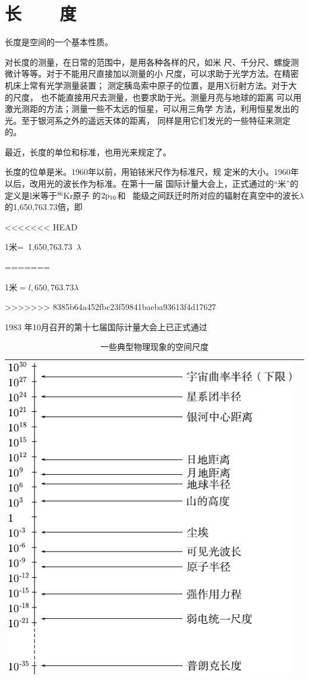 \section[长度]{长~~~~度}\label{sec:01.03}

长度是空间的一个基本性质。

对长度的测量，在日常的范围中，是用各种各样的尺，如米
尺、千分尺、螺旋测微计等等。对于不能用尺直接加以测量的小
尺度，可以求助于光学方法。在精密机床上常有光学测量装置；
测定胰岛索中原子的位置，是用X衍射方法。对于大的尺度，
也不能直接用尺去测量，也要求助于光。测量月亮与地球的距离
可以用激光测距的方法；测量一些不太远的恒星，可以用三角学
方法，利用恒星发出的光。至于银河系之外的遥远天体的距离，
同样是用它们发光的一些特征来测定的。

最近，长度的单位和标准，也用光来规定了。

长度的位单是米。1960年以前，用铂铱米尺作为标准尺，规
定米的大小。1960年以后，改用光的波长作为标准。在第十一届
国际计量大会上，正式通过的“米”的定义是l米等于$^{86}$Kr原子
的$2\rm{p}_{10}$和~
能级之间跃迁时所对应的辐射在真空中的波长$\lambda$的1,650,763.73倍，即

<<<<<<< HEAD
\centerline{1米=~1,650,763.73~$\lambda$}
=======
\centerline{1米$=l,650,763.73\lambda$}
>>>>>>> 8385b64a452fbc23f59841baeba93613f4d17627


1983 年10月召开的第十七届国际计量大会上已正式通过
\\
\begin{table}[!h]
    \centering
    \caption{一些典型物理现象的空间尺度}
    \label{tab:01.03}
    \begin{tabular*}{\linewidth}{>{\centering}m{\linewidth}c}
        \toprule
        \includegraphics[width=0.8\linewidth]{figure/tab01.03} & \\
        \bottomrule
    \end{tabular*}
\end{table}
\clearpage

